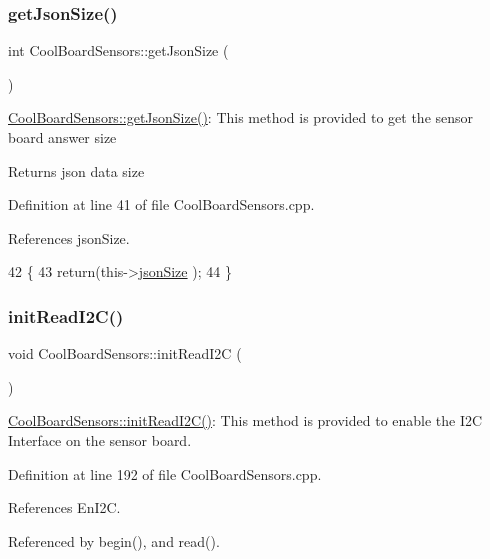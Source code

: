 \subsubsection{\texorpdfstring{get\+Json\+Size()}{getJsonSize()}}
{\footnotesize\ttfamily int Cool\+Board\+Sensors\+::get\+Json\+Size (\begin{DoxyParamCaption}{ }\end{DoxyParamCaption})}

\hyperlink{classCoolBoardSensors_ab82c2a1633768ccd12a589320fa31a14}{Cool\+Board\+Sensors\+::get\+Json\+Size()}\+: This method is provided to get the sensor board answer size

\begin{DoxyReturn}{Returns}
json data size 
\end{DoxyReturn}


Definition at line 41 of file Cool\+Board\+Sensors.\+cpp.



References json\+Size.


\begin{DoxyCode}
42 \{
43     \textcolor{keywordflow}{return}(this->\hyperlink{classCoolBoardSensors_a05a40dc80bfff14ffb830f549b876f8d}{jsonSize} );
44 \}
\end{DoxyCode}
\mbox{\label{classCoolBoardSensors_acad6a8418c66d36868caca23c844ecb6}} 
\subsubsection{\texorpdfstring{init\+Read\+I2\+C()}{initReadI2C()}}
{\footnotesize\ttfamily void Cool\+Board\+Sensors\+::init\+Read\+I2C (\begin{DoxyParamCaption}{ }\end{DoxyParamCaption})}

\hyperlink{classCoolBoardSensors_acad6a8418c66d36868caca23c844ecb6}{Cool\+Board\+Sensors\+::init\+Read\+I2\+C()}\+: This method is provided to enable the I2C Interface on the sensor board. 

Definition at line 192 of file Cool\+Board\+Sensors.\+cpp.



References En\+I2C.



Referenced by begin(), and read().


